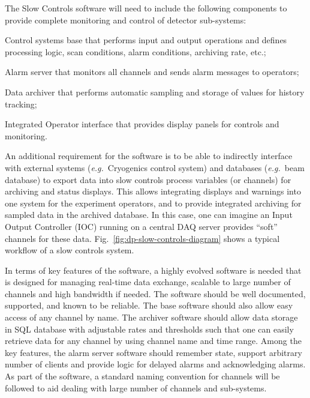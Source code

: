 
The Slow Controls software will need to include the following components
to provide complete monitoring and control of detector sub-systems:
%
\begin{description}
 \item{Control systems base} that performs input and output operations
  and defines processing logic, scan conditions, alarm conditions,
  archiving rate, etc.;
 \item{Alarm server} that monitors all channels and sends alarm
  messages to operators; 
 \item{Data archiver} that performs automatic sampling and storage of
  values for history tracking;
 \item{Integrated Operator interface} that provides display panels for
  controls and monitoring.
\end{description}

An additional requirement for the software is to be able to indirectly
interface with external systems ({\em e.g.}\ Cryogenics control
system) and databases ({\em e.g.}\ beam database) to export data into
slow controls process variables (or channels) for archiving and status
displays. This allows integrating displays and warnings into one
system for the experiment operators, and to provide integrated
archiving for sampled data in the archived database. In this case, one
can imagine an Input Output Controller (IOC) running on a central DAQ
server provides ``soft'' channels for these data.
Fig.\ \ref{fig:dp-slow-controls-diagram} shows a typical workflow of a
slow controls system.

In terms of key features of the software, a highly evolved software is
needed that is designed for managing real-time data exchange, scalable
to large number of channels and high bandwidth if needed. The software
should be well documented, supported, and known to be reliable. The base
software should also allow easy access of any channel by name. The
archiver software should allow data storage in SQL database with
adjustable rates and thresholds such that one can easily retrieve data
for any channel by using channel name and time range. Among the key
features, the alarm server software should remember state, support
arbitrary number of clients and provide logic for delayed alarms and
acknowledging alarms. As part of the software, a standard naming
convention for channels will be followed to aid dealing with large
number of channels and sub-systems.

